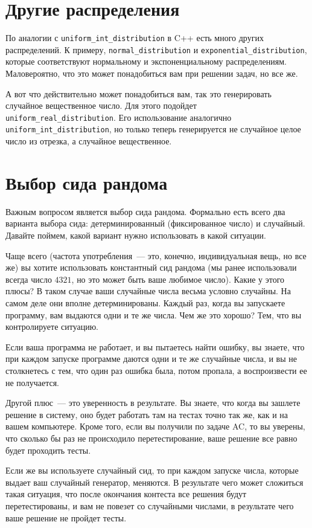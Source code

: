 \section{Другие распределения}

По аналогии с \verb+uniform_int_distribution+ в C++ есть много других распределений. К примеру, \verb+normal_distribution+ и \verb+exponential_distribution+, которые соответствуют нормальному и экспоненциальному распределениям. Маловероятно, что это может понадобиться вам при решении задач, но все же.

А вот что действительно может понадобиться вам, так это генерировать случайное вещественное число. Для этого подойдет \verb+uniform_real_distribution+. Его использование аналогично \verb+uniform_int_distribution+, но только теперь генерируется не случайное целое число из отрезка, а случайное вещественное.

\section{Выбор сида рандома}

Важным вопросом является выбор сида рандома. Формально есть всего два варианта выбора сида: детерминированный (фиксированное число) и случайный. Давайте поймем, какой вариант нужно использовать в какой ситуации.

Чаще всего (частота употребления~--- это, конечно, индивидуальная вещь, но все же) вы хотите использовать константный сид рандома (мы ранее использовали всегда число $4321$, но это может быть ваше любимое число). Какие у этого плюсы? В таком случае ваши случайные числа весьма условно случайны. На самом деле они вполне детерминированы. Каждый раз, когда вы запускаете программу, вам выдаются одни и те же числа. Чем же это хорошо? Тем, что вы контролируете ситуацию.

Если ваша программа не работает, и вы пытаетесь найти ошибку, вы знаете, что при каждом запуске программе даются одни и те же случайные числа, и вы не столкнетесь с тем, что один раз ошибка была, потом пропала, а воспроизвести ее не получается.

Другой плюс~--- это уверенность в результате. Вы знаете, что когда вы зашлете решение в систему, оно будет работать там на тестах точно так же, как и на вашем компьютере. Кроме того, если вы получили по задаче AC, то вы уверены, что сколько бы раз не происходило перетестирование, ваше решение все равно будет проходить тесты.

Если же вы используете случайный сид, то при каждом запуске числа, которые выдает ваш случайный генератор, меняются. В результате чего может сложиться такая ситуация, что после окончания контеста все решения будут перетестированы, и вам не повезет со случайными числами, в результате чего ваше решение не пройдет тесты.

